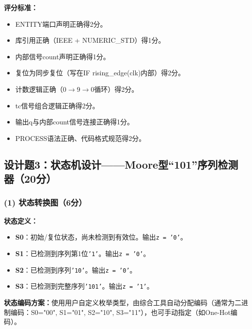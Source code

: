 \medskip
\noindent\textbf{评分标准：}
\begin{itemize}
  \item ENTITY端口声明正确得2分。
  \item 库引用正确（IEEE + NUMERIC\_STD）得1分。
  \item 内部信号count声明正确得1分。
  \item 复位为同步复位（写在IF rising\_edge(clk)内部）得2分。
  \item 计数逻辑正确（0$\to$9$\to$0循环）得2分。
  \item tc信号组合逻辑正确得2分。
  \item 输出q与内部count信号连接正确得1分。
  \item PROCESS语法正确、代码格式规范得2分。
\end{itemize}

\newpage
\subsection{设计题3：状态机设计——Moore型“101”序列检测器（20分）}

\subsubsection*{(1) 状态转换图（6分）}

\noindent\textbf{状态定义：}
\begin{itemize}
  \item \textbf{S0}：初始/复位状态，尚未检测到有效位。输出\texttt{z = '0'}。
  \item \textbf{S1}：已检测到序列第1位\texttt{'1'}。输出\texttt{z = '0'}。
  \item \textbf{S2}：已检测到序列\texttt{'10'}。输出\texttt{z = '0'}。
  \item \textbf{S3}：已检测到完整序列\texttt{'101'}。输出\texttt{z = '1'}。
\end{itemize}

\noindent\textbf{状态编码方案：}使用用户自定义枚举类型，由综合工具自动分配编码（通常为二进制编码：S0="00", S1="01", S2="10", S3="11"），也可手动指定（如One-Hot编码）。

